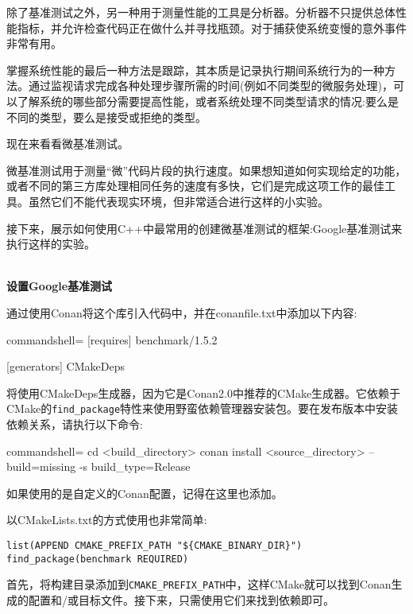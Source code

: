除了基准测试之外，另一种用于测量性能的工具是分析器。分析器不只提供总体性能指标，并允许检查代码正在做什么并寻找瓶颈。对于捕获使系统变慢的意外事件非常有用。

掌握系统性能的最后一种方法是跟踪，其本质是记录执行期间系统行为的一种方法。通过监视请求完成各种处理步骤所需的时间(例如不同类型的微服务处理)，可以了解系统的哪些部分需要提高性能，或者系统处理不同类型请求的情况:要么是不同的类型，要么是接受或拒绝的类型。

现在来看看微基准测试。


微基准测试用于测量“微”代码片段的执行速度。如果想知道如何实现给定的功能，或者不同的第三方库处理相同任务的速度有多快，它们是完成这项工作的最佳工具。虽然它们不能代表现实环境，但非常适合进行这样的小实验。

接下来，展示如何使用C++中最常用的创建微基准测试的框架:Google基准测试来执行这样的实验。

\hspace*{\fill} \\ %
\noindent
\textbf{设置Google基准测试}

通过使用Conan将这个库引入代码中，并在conanfile.txt中添加以下内容:

\begin{tcblisting}{commandshell={}}
[requires]
benchmark/1.5.2

[generators]
CMakeDeps	
\end{tcblisting}

将使用CMakeDeps生成器，因为它是Conan2.0中推荐的CMake生成器。它依赖于CMake的\texttt{find\_package}特性来使用野蛮依赖管理器安装包。要在发布版本中安装依赖关系，请执行以下命令:

\begin{tcblisting}{commandshell={}}
cd <build_directory>
conan install <source_directory> --build=missing -s build_type=Release
\end{tcblisting}

如果使用的是自定义的Conan配置，记得在这里也添加。

以CMakeLists.txt的方式使用也非常简单:

\begin{lstlisting}[style=styleCMake]
list(APPEND CMAKE_PREFIX_PATH "${CMAKE_BINARY_DIR}")
find_package(benchmark REQUIRED)
\end{lstlisting}

首先，将构建目录添加到\texttt{CMAKE\_PREFIX\_PATH}中，这样CMake就可以找到Conan生成的配置和/或目标文件。接下来，只需使用它们来找到依赖即可。

